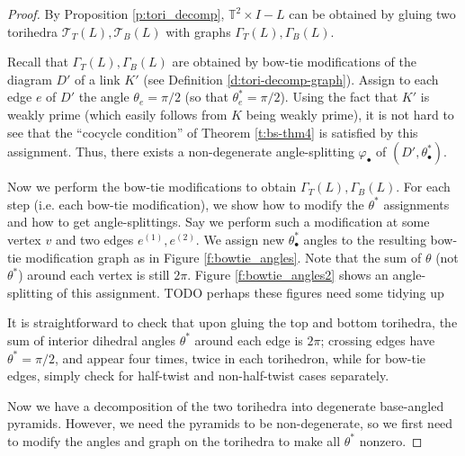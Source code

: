 \documentclass[11pt]{amsart}
\newcommand{\thmref}[1]{Theorem \ref{#1}}
\newcommand{\prpref}[1]{Proposition \ref{#1}}
\newcommand{\defref}[1]{Definition \ref{#1}}
\newcommand{\figref}[1]{Figure \ref{#1}}
\newcommand{\torus}{{\mathbb{T}^2}}
\newcommand{\sT}{{\mathcal{T}}}
\newcommand{\vphi}{\varphi}
\newcommand{\toruscomp}[1]{{\torus \times I - #1}}
\theoremstyle{plain}
\theoremstyle{definition}
\begin{document}
\begin{proof}
By \prpref{p:tori_decomp}, $\toruscomp{L}$ can be
obtained by gluing two torihedra $\sT_T(L),\sT_B(L)$
with graphs $\Gamma_T(L),\Gamma_B(L)$.


Recall that $\Gamma_T(L),\Gamma_B(L)$ are
obtained by bow-tie modifications of the diagram $D'$
of a link $K'$
(see \defref{d:tori-decomp-graph}).
Assign to each edge $e$ of $D'$ the angle $\theta_e = \pi/2$
(so that $\theta_e^* = \pi/2$).
Using the fact that $K'$ is weakly prime
(which easily follows from $K$ being weakly prime),
it is not hard to see that the ``cocycle condition''
of \thmref{t:bs-thm4} is satisfied by this assignment.
Thus, there exists a non-degenerate angle-splitting
$\vphi_\bullet$ of $(D',\theta_\bullet^*)$.


Now we perform the bow-tie modifications to obtain
$\Gamma_T(L),\Gamma_B(L)$.
For each step (i.e. each bow-tie modification),
we show how to modify the $\theta^*$ assignments
and how to get angle-splittings.
Say we perform such a modification
at some vertex $v$ and two edges $e^{(1)},e^{(2)}$.
We assign new $\theta_\bullet^*$ angles to
the resulting bow-tie modification graph
as in \figref{f:bowtie_angles}.
Note that the sum of $\theta$ (not $\theta^*$)
around each vertex is still $2\pi$.
\figref{f:bowtie_angles2} shows an angle-splitting
of this assignment.
TODO perhaps these figures need some tidying up


It is straightforward to check that
upon gluing the top and bottom torihedra,
the sum of interior dihedral angles $\theta^*$
around each edge is $2\pi$;
crossing edges have $\theta^* = \pi/2$,
and appear four times, twice in each torihedron,
while for bow-tie edges,
simply check for half-twist and non-half-twist cases
separately.


Now we have a decomposition of the two torihedra into
degenerate base-angled pyramids.
However, we need the pyramids to be non-degenerate,
so we first need to modify the angles and graph on the torihedra
to make all $\theta^*$ nonzero.



\end{proof}
\end{document}
